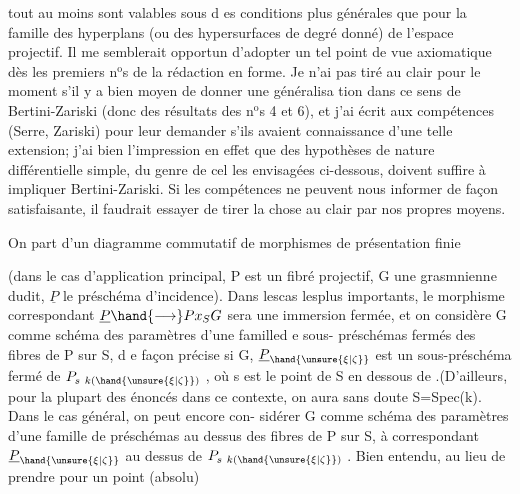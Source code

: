 
tout au moins sont valables sous d es conditions plus générales que pour la
famille des hyperplans (ou des hypersurfaces de degré donné) de l'espace
projectif. Il me semblerait opportun d'adopter un tel point de vue
axiomatique dès les premiers n$^{\text{o}}$s de la rédaction en forme. Je n'ai pas
tiré au clair pour le moment s'il y a bien moyen de donner une généralisa%
tion dans ce sens de Bertini-Zariski (donc des résultats des n$^{\text{o}}$s 4 et 6),
et j'ai écrit aux compétences (Serre, Zariski) pour leur demander s'ils
avaient connaissance d'une telle extension; j'ai bien l'impression en
effet que des hypothèses de nature différentielle simple, du genre de cel
les envisagées ci-dessous, doivent suffire à impliquer Bertini-Zariski.
Si les compétences ne peuvent nous informer de façon satisfaisante, il
faudrait essayer de tirer la chose au clair par nos propres moyens.

On part d'un diagramme commutatif de morphismes de présentation finie


(dans le cas d'application principal, P est un fibré projectif, G une
grasmnienne dudit, $\underline{P}$ le préschéma d'incidence). Dans lescas lesplus
importants, le morphisme correspondant $\underline{P} \hand{\longrightarrow} Px_S G$ sera une immersion
fermée, et on considère G comme  schéma des paramètres d'une familled e sous-
préschémas fermés des fibres de P sur S, d e façon précise si \hand{\unsure{\xi|\zeta}} \hand{$\in$} G,
$\underline{P}_{\hand{\unsure{\xi|\zeta}}}$ est un sous-préschéma fermé de $P_{s\ k(\hand{\unsure{\xi|\zeta}})}$ , où s est le point de S en
dessous de \hand{\unsure{\xi|\zeta}} .(D'ailleurs, pour la plupart des énoncés dans ce contexte,
on aura sans doute S=Spec(k)\hand{)}. Dans le cas général, on peut encore con-%
sidérer G comme schéma des paramètres d'une famille de préschémas
au dessus des fibres de P sur S, à \hand{\unsure{\xi|\zeta}} correspondant $\underline{P}_{\hand{\unsure{\xi|\zeta}}}$ au dessus de
$P_{s\ k(\hand{\unsure{\xi|\zeta}})}$ . Bien entendu, au lieu de prendre pour \hand{\unsure{\xi|\zeta}} un point  (absolu)


